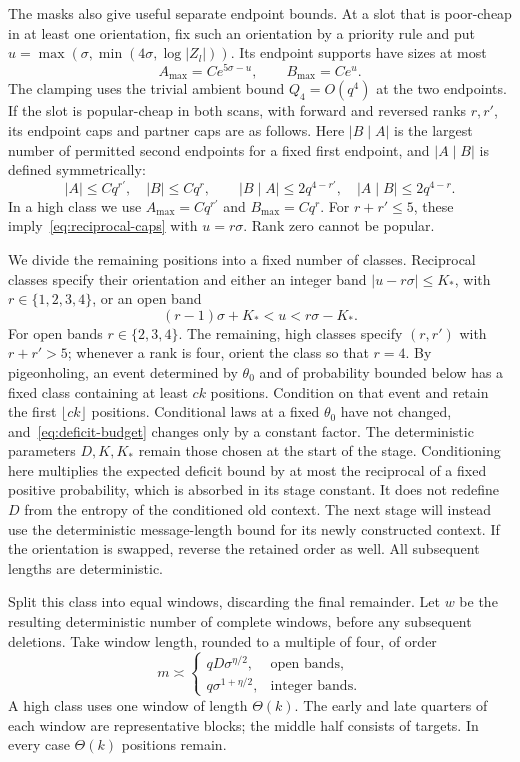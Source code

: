The masks also give useful separate endpoint bounds.  At a slot that is
poor-cheap in at least one orientation, fix such an orientation by a
priority rule and put
$u=\max(\sigma,\min(4\sigma,\log|Z_l|))$.  Its endpoint supports have
sizes at most
\begin{equation}\label{eq:reciprocal-caps}
 A_{\max}=Ce^{5\sigma-u},\qquad B_{\max}=Ce^u.
\end{equation}
The clamping uses the trivial ambient bound $Q_4=O(q^4)$ at the two
endpoints.  If the slot is popular-cheap in both scans, with forward
and reversed ranks $r,r'$, its endpoint caps and partner caps are
as follows.  Here $|B\mid A|$ is the largest number of permitted second
endpoints for a fixed first endpoint, and $|A\mid B|$ is defined symmetrically:
\begin{equation}\label{eq:high-caps}
 |A|\le Cq^{r'},\quad |B|\le Cq^r,\qquad
 |B\mid A|\le2q^{4-r'},\quad |A\mid B|\le2q^{4-r}.
\end{equation}
In a high class we use $A_{\max}=Cq^{r'}$ and $B_{\max}=Cq^r$.
For $r+r'\le5$, these imply~\eqref{eq:reciprocal-caps} with $u=r\sigma$.
Rank zero cannot be popular.

We divide the remaining positions into a fixed number of classes.
Reciprocal classes specify their orientation and either an integer band
$|u-r\sigma|\le K_*$, with $r\in\{1,2,3,4\}$, or an open band
\[
 (r-1)\sigma+K_*<u<r\sigma-K_*.
\]
For open bands $r\in\{2,3,4\}$.
The remaining, high classes specify $(r,r')$ with $r+r'>5$; whenever a
rank is four, orient the class so that $r=4$.
By pigeonholing, an event determined by $\theta_0$ and of probability
bounded below has a fixed class containing at least $c k$ positions.
Condition on that event and retain the first $\lfloor c k\rfloor$
positions.  Conditional laws at a fixed $\theta_0$ have not changed,
and~\eqref{eq:deficit-budget} changes only by a constant factor.
The deterministic parameters $D,K,K_*$ remain those chosen at the
start of the stage.  Conditioning here multiplies the expected deficit
bound by at most the reciprocal of a fixed positive probability, which
is absorbed in its stage constant.  It does not redefine $D$ from the
entropy of the conditioned old context.  The next stage will instead
use the deterministic message-length bound for its newly constructed
context.
If the orientation is swapped, reverse the retained order as well.
All subsequent lengths are deterministic.

Split this class into equal windows, discarding the final remainder.
Let $w$ be the resulting deterministic number of complete windows, before
any subsequent deletions.
Take window length, rounded to a multiple of four, of order
\begin{equation}\label{eq:window-lengths}
 m\asymp
 \begin{cases}
 qD\sigma^{\eta/2},&\text{open bands},\\
 q\sigma^{1+\eta/2},&\text{integer bands}.
 \end{cases}
\end{equation}
A high class uses one window of length $\Theta(k)$.
The early and late quarters of each window are representative blocks;
the middle half consists of targets.  In every case $\Theta(k)$
positions remain.

